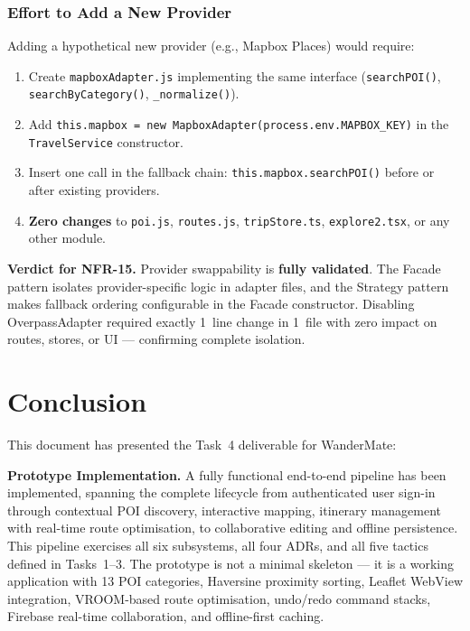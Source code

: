 \documentclass[12pt, a4paper]{article}
\newcommand{\code}[1]{\texttt{\small #1}}
\begin{document}
\subsubsection{Effort to Add a New Provider}

Adding a hypothetical new provider (e.g., Mapbox Places) would require:
\begin{enumerate}
  \item Create \code{mapboxAdapter.js} implementing the same interface (\code{searchPOI()}, \code{searchByCategory()}, \code{\_normalize()}).
  \item Add \code{this.mapbox = new MapboxAdapter(process.env.MAPBOX\_KEY)} in the \code{TravelService} constructor.
  \item Insert one call in the fallback chain: \code{this.mapbox.searchPOI()} before or after existing providers.
  \item \textbf{Zero changes} to \code{poi.js}, \code{routes.js}, \code{tripStore.ts}, \code{explore2.tsx}, or any other module.
\end{enumerate}

\begin{tcolorbox}[notebox]
  \textbf{Verdict for NFR-15.} Provider swappability is \textbf{fully validated}. The Facade pattern isolates provider-specific logic in adapter files, and the Strategy pattern makes fallback ordering configurable in the Facade constructor. Disabling OverpassAdapter required exactly 1~line change in 1~file with zero impact on routes, stores, or UI --- confirming complete isolation.
\end{tcolorbox}

\section{Conclusion}

This document has presented the Task~4 deliverable for WanderMate:

\textbf{Prototype Implementation.} A fully functional end-to-end pipeline has been implemented, spanning the complete lifecycle from authenticated user sign-in through contextual POI discovery, interactive mapping, itinerary management with real-time route optimisation, to collaborative editing and offline persistence. This pipeline exercises all six subsystems, all four ADRs, and all five tactics defined in Tasks~1--3. The prototype is not a minimal skeleton --- it is a working application with 13 POI categories, Haversine proximity sorting, Leaflet WebView integration, VROOM-based route optimisation, undo/redo command stacks, Firebase real-time collaboration, and offline-first caching.
\end{document}
